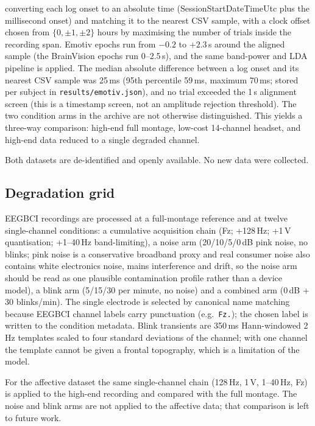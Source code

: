 converting each log onset to an absolute time (SessionStartDateTimeUtc plus the
millisecond onset) and matching it to the nearest CSV sample, with a clock offset chosen
from $\{0,\pm1,\pm2\}$ hours by maximising the number of trials inside the recording
span. Emotiv epochs run from $-0.2$ to $+2.3$\,s around the aligned sample (the
BrainVision epochs run 0--2.5\,s), and the same band-power and LDA pipeline is applied.
The median absolute difference between a log onset and its nearest CSV sample was
25\,ms (95th percentile 59\,ms, maximum 70\,ms; stored per subject in
\texttt{results/emotiv.json}), and no trial exceeded the 1\,s alignment screen (this is a timestamp screen, not an amplitude rejection threshold). The
two condition arms in the archive are not otherwise distinguished. This yields a
three-way comparison: high-end full montage, low-cost 14-channel headset, and high-end
data reduced to a single degraded channel.

Both datasets are de-identified and openly available. No new data were collected.

\subsection*{Degradation grid}
EEGBCI recordings are processed at a full-montage reference and at twelve
single-channel conditions: a cumulative acquisition chain (Fz; +128\,Hz; +1\,\textmu V
quantisation; +1--40\,Hz band-limiting), a noise arm (20/10/5/0\,dB pink noise, no
blinks; pink noise is a conservative broadband proxy and real consumer noise also
contains white electronics noise, mains interference and drift, so the noise arm should
be read as one plausible contamination profile rather than a device model), a blink arm (5/15/30 per minute, no noise) and a combined arm (0\,dB + 30
blinks/min). The single electrode is selected by canonical name matching because
EEGBCI channel labels carry punctuation (e.g.\ \texttt{Fz.}); the chosen label is
written to the condition metadata. Blink transients are 350\,ms Hann-windowed 2\,Hz
templates scaled to four standard deviations of the channel; with one channel the
template cannot be given a frontal topography, which is a limitation of the model.

For the affective dataset the same single-channel chain (128\,Hz, 1\,\textmu V,
1--40\,Hz, Fz) is applied to the high-end recording and compared with the full
montage. The noise and blink arms are not applied to the affective data; that
comparison is left to future work.

